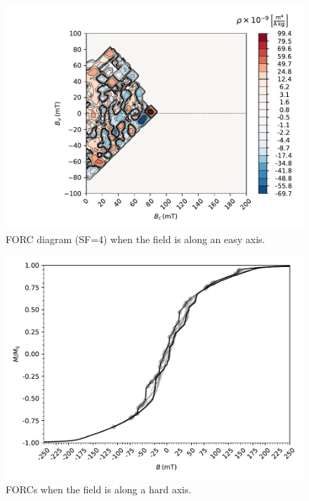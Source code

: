 \begin{figure}
\centering
\includegraphics[width=\textwidth]{research-4/figs/FORC_21_SF4.pdf}
\caption[FORC diagram when the field is along an easy axis]{FORC diagram (SF=4) when the field is along an easy axis.}
\label{FIG_03}
\end{figure}

\begin{figure}
\centering
\includegraphics[width=\textwidth]{research-4/figs/BM16_withFORCS.pdf}
\caption[FORCs when the field is along a hard axis]{FORCs when the field is along a hard axis.}
\label{FIG_04}
\end{figure}

